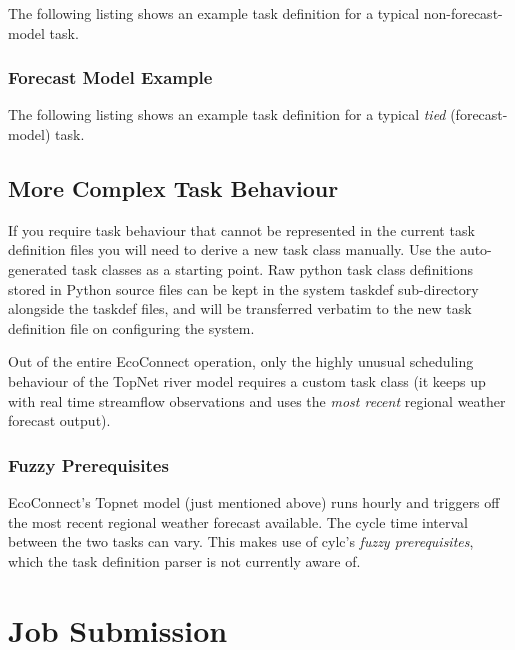 \documentclass[11pt,a4paper]{article}
\begin{document}
The following listing shows an example task definition for a
typical non-forecast-model task.
\lstset{language=cylctaskdef}

{

}

\pagebreak
\subsubsection{Forecast Model Example}

The following listing shows an example task definition for a
typical {\em tied} (forecast-model) task.

\lstset{language=cylctaskdef}

{

}


\pagebreak
\subsection{More Complex Task Behaviour}
\label{MoreComplexTaskBehaviour}

If you require task behaviour that cannot be represented in the current 
task definition files you will need to derive a new task class manually.
Use the auto-generated task classes as a starting point. Raw python 
task class definitions stored in Python source files can be 
kept in the system taskdef sub-directory alongside the taskdef files,
and will be transferred verbatim to the new task definition file on 
configuring the system. 

Out of the entire EcoConnect operation, only the highly unusual
scheduling behaviour of the TopNet river model requires a custom task
class (it keeps up with real time streamflow observations and uses
the {\em most recent} regional weather forecast output). 

\subsubsection{Fuzzy Prerequisites}

EcoConnect's Topnet model (just mentioned above) runs hourly and
triggers off the most recent regional weather forecast available.
The cycle time interval between the two tasks can vary. This makes 
use of cylc's {\em fuzzy prerequisites}, which the task definition
parser is not currently aware of.


\pagebreak


\pagebreak
\section{Job Submission}
\label{JobSubmission}
\end{document}
